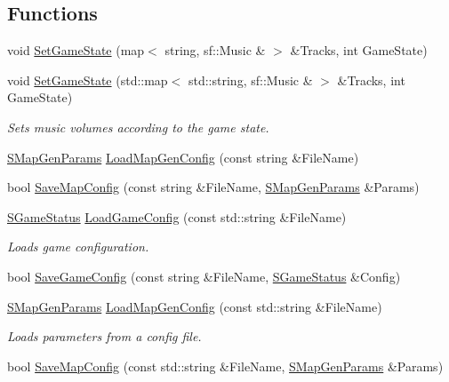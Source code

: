 \subsection*{Functions}
\begin{DoxyCompactItemize}
\item 
void \hyperlink{namespace_chase_game_a7d444b6a4ab8bbb4fa6ae736eb629477}{Set\-Game\-State} (map$<$ string, sf\-::\-Music \& $>$ \&Tracks, int Game\-State)
\item 
void \hyperlink{namespace_chase_game_a5aeec1309079c5c64aec0fd24a4b17c1}{Set\-Game\-State} (std\-::map$<$ std\-::string, sf\-::\-Music \& $>$ \&Tracks, int Game\-State)
\begin{DoxyCompactList}\small\item\em Sets music volumes according to the game state. \end{DoxyCompactList}\item 
\hyperlink{struct_chase_game_1_1_s_map_gen_params}{S\-Map\-Gen\-Params} \hyperlink{namespace_chase_game_a4779af792d3de8e274049bf2019e0343}{Load\-Map\-Gen\-Config} (const string \&File\-Name)
\item 
bool \hyperlink{namespace_chase_game_a98e8d90127c802c1445266e39966c3fb}{Save\-Map\-Config} (const string \&File\-Name, \hyperlink{struct_chase_game_1_1_s_map_gen_params}{S\-Map\-Gen\-Params} \&Params)
\item 
\hyperlink{struct_chase_game_1_1_s_game_status}{S\-Game\-Status} \hyperlink{namespace_chase_game_addd460052ec5a5fe3010665ca84b07ec}{Load\-Game\-Config} (const std\-::string \&File\-Name)
\begin{DoxyCompactList}\small\item\em Loads game configuration. \end{DoxyCompactList}\item 
bool \hyperlink{namespace_chase_game_a39f8b039151b1a3eef82fdc1c6f52091}{Save\-Game\-Config} (const string \&File\-Name, \hyperlink{struct_chase_game_1_1_s_game_status}{S\-Game\-Status} \&Config)
\item 
\hyperlink{struct_chase_game_1_1_s_map_gen_params}{S\-Map\-Gen\-Params} \hyperlink{namespace_chase_game_a9c5b5d91cb4251cae461faa4ace8a0cf}{Load\-Map\-Gen\-Config} (const std\-::string \&File\-Name)
\begin{DoxyCompactList}\small\item\em Loads parameters from a config file. \end{DoxyCompactList}\item 
bool \hyperlink{namespace_chase_game_a4c62f61c6aac5bf06292aa51294fd211}{Save\-Map\-Config} (const std\-::string \&File\-Name, \hyperlink{struct_chase_game_1_1_s_map_gen_params}{S\-Map\-Gen\-Params} \&Params)

\end{DoxyCompactItemize}
